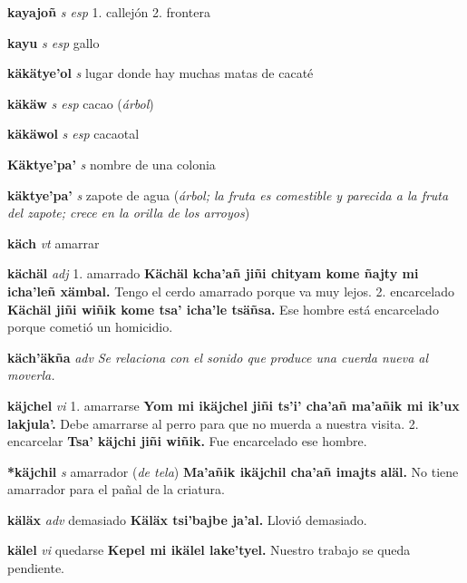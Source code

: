 \documentclass[10pt]{scrbook}
\newcommand{\entry}[1]{\textbf{#1}}
\newcommand{\onedefinition}[1]{#1.}
\newcommand{\nontranslationdef}[1]{\textit{#1}}
\newcommand{\partofspeech}[1]{\textit{#1}}
\newcommand{\spanishtranslation}[1]{#1}
\newcommand{\clarification}[1]{(\textit{#1})}
\newcommand{\cholexample}[1]{\textbf{#1}}
\newcommand{\exampletranslation}[1]{#1}
\begin{document}
\begin{multicols}{2}
\entry{kayajoñ}
\partofspeech{s esp}
\onedefinition{1}
\spanishtranslation{callejón}
\onedefinition{2}
\spanishtranslation{frontera}

\entry{kayu}
\partofspeech{s esp}
\spanishtranslation{gallo}

\entry{käkätye'ol}
\partofspeech{s}
\spanishtranslation{lugar donde hay muchas matas de cacaté}

\entry{käkäw}
\partofspeech{s esp}
\spanishtranslation{cacao}
\clarification{árbol}

\entry{käkäwol}
\partofspeech{s esp}
\spanishtranslation{cacaotal}

\entry{Käktye'pa'}
\partofspeech{s}
\spanishtranslation{nombre de una colonia}

\entry{käktye'pa'}
\partofspeech{s}
\spanishtranslation{zapote de agua}
\clarification{árbol; la fruta es comestible y parecida a la fruta del zapote; crece en la orilla de los arroyos}

\entry{käch}
\partofspeech{vt}
\spanishtranslation{amarrar}

\entry{kächäl}
\partofspeech{adj}
\onedefinition{1}
\spanishtranslation{amarrado}
\cholexample{Kächäl kcha'añ jiñi chityam kome ñajty mi icha'leñ xämbal.}
\exampletranslation{Tengo el cerdo amarrado porque va muy lejos.}
\onedefinition{2}
\spanishtranslation{encarcelado}
\cholexample{Kächäl jiñi wiñik kome tsa' icha'le tsäñsa.}
\exampletranslation{Ese hombre está encarcelado porque cometió un homicidio.}

\entry{käch'äkña}
\partofspeech{adv}
\nontranslationdef{Se relaciona con el sonido que produce una cuerda nueva al moverla.}

\entry{käjchel}
\partofspeech{vi}
\onedefinition{1}
\spanishtranslation{amarrarse}
\cholexample{Yom mi ikäjchel jiñi ts'i' cha'añ ma'añik mi ik'ux lakjula'.}
\exampletranslation{Debe amarrarse al perro para que no muerda a nuestra visita.}
\onedefinition{2}
\spanishtranslation{encarcelar}
\cholexample{Tsa' käjchi jiñi wiñik.}
\exampletranslation{Fue encarcelado ese hombre.}

\entry{*käjchil}
\partofspeech{s}
\spanishtranslation{amarrador}
\clarification{de tela}
\cholexample{Ma'añik ikäjchil cha'añ imajts aläl.}
\exampletranslation{No tiene amarrador para el pañal de la criatura.}

\entry{käläx}
\partofspeech{adv}
\spanishtranslation{demasiado}
\cholexample{Käläx tsi'bajbe ja'al.}
\exampletranslation{Llovió demasiado.}

\entry{kälel}
\partofspeech{vi}
\spanishtranslation{quedarse}
\cholexample{Kepel mi ikälel lake'tyel.}
\exampletranslation{Nuestro trabajo se queda pendiente.}


\end{multicols}
\end{document}
